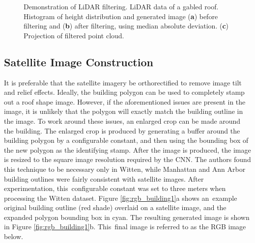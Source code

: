 \begin{figure}[t]
\begin{minipage}{0.45\linewidth}
\begin{subfigure}[b]{\textwidth}
           \caption{}
           \label{fig:point_cloud_projection} 
        \end{subfigure}
    \end{minipage}
\caption[Demonstration of LiDAR filtering]{Demonstration of LiDAR filtering. LiDAR data of a gabled roof.  Histogram of height distribution and generated image (\textbf{a}) before filtering and (\textbf{b}) after filtering, using median absolute deviation. (\textbf{c}) Projection of filtered point cloud. }
\label{fig:lidar_filt}
\end{figure}


\subsection{Satellite Image Construction}\label{sec:satellite_construction}

It is preferable that the satellite imagery be orthorectified to remove image tilt and relief effects. Ideally, the building polygon can be used to completely stamp out a roof shape image. However, if the aforementioned issues are present in the image, it is unlikely that the polygon will exactly match the building outline in the image. To work around these issues, an enlarged crop can be made around the building. The enlarged crop is produced by generating a buffer around the building polygon by a configurable constant, and then using the bounding box of the new polygon as the identifying stamp.  After the image is produced, the image is resized to the square image resolution required by the \ac{CNN}. The authors found this technique to be necessary only in Witten, while Manhattan and Ann Arbor building outlines were fairly consistent with satellite images. After experimentation, this~configurable constant was set to three meters when processing the Witten dataset.  
Figure \ref{fig:rgb_building1}a shows an~example original building outline (red shade) overlaid on a satellite image, and the expanded polygon bounding box in cyan. The resulting generated image is shown in Figure \ref{fig:rgb_building1}b. This~final image is referred to as the RGB image below.



